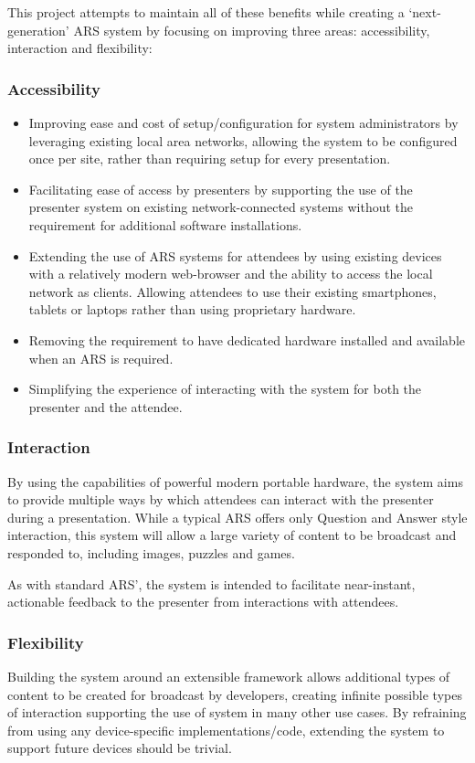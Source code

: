 \documentclass[a4papert,11pt,notitlepage]{ltxdoc}
\begin{document}
This project attempts to maintain all of these benefits while creating a `next-generation' ARS system by focusing on improving three areas: accessibility, interaction and flexibility:

\subsubsection{Accessibility}
\begin{itemize}
\item Improving ease and cost of setup/configuration for system administrators by leveraging existing local area networks, allowing the system to be configured once per site, rather than requiring setup for every presentation.
\item Facilitating ease of access by presenters by supporting the use of the presenter system on existing network-connected systems without the requirement for additional software installations.
\item Extending the use of ARS systems for attendees by using existing devices with a relatively modern web-browser and the ability to access the local network as clients. Allowing attendees to use their existing smartphones, tablets or laptops rather than using proprietary hardware.
\item Removing the requirement to have dedicated hardware installed and available when an ARS is required.
\item Simplifying the experience of interacting with the system for both the presenter and the attendee.
\end{itemize}

\subsubsection{Interaction}
By using the capabilities of powerful modern portable hardware, the system aims to provide multiple ways by which attendees can interact with the presenter during a presentation. While a typical ARS offers only Question and Answer style interaction, this system will allow a large variety of content to be broadcast and responded to, including images, puzzles and games.

As with standard ARS', the system is intended to facilitate near-instant, actionable feedback to the presenter from interactions with attendees.

\subsubsection{Flexibility}
Building the system around an extensible framework allows additional types of content to be created for broadcast by developers, creating infinite possible types of interaction supporting the use of system in many other use cases. By refraining from using any device-specific implementations/code, extending the system to support future devices should be trivial.
\end{document}
